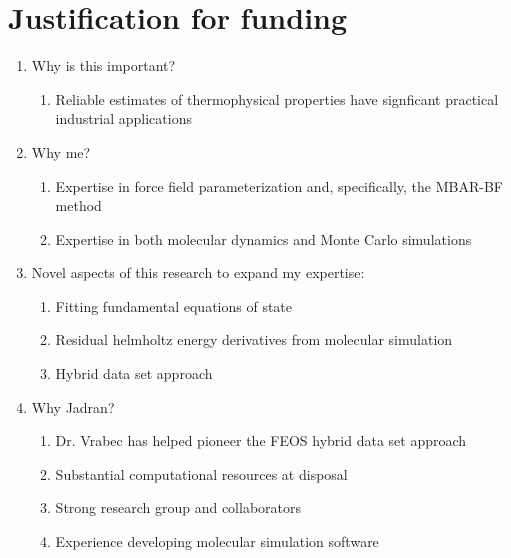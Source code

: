\documentclass[11pt,a4paper]{article}
\begin{document}
\section{Justification for funding}
\begin{enumerate}
    \item Why is this important?
    \begin{enumerate}
	    \item Reliable estimates of thermophysical properties have signficant practical industrial applications
    \end{enumerate}	
    \item Why me?
    \begin{enumerate}
	    \item Expertise in force field parameterization and, specifically, the MBAR-BF method
	    \item Expertise in both molecular dynamics and Monte Carlo simulations
	\end{enumerate}
	\item Novel aspects of this research to expand my expertise:
	\begin{enumerate}
		\item Fitting fundamental equations of state
		\item Residual helmholtz energy derivatives from molecular simulation
		\item Hybrid data set approach
	\end{enumerate}
    \item Why Jadran?
    \begin{enumerate}
	    \item Dr. Vrabec has helped pioneer the FEOS hybrid data set approach
	    \item Substantial computational resources at disposal
	    \item Strong research group and collaborators
	    \item Experience developing molecular simulation software
    \end{enumerate}
\end{enumerate}
\end{document}

